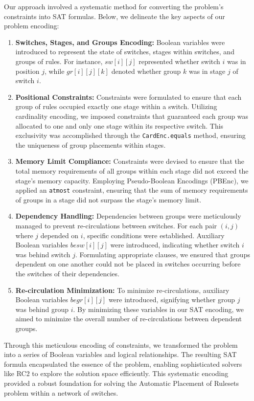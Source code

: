 Our approach involved a systematic method for converting the problem's constraints into SAT formulas. Below, we delineate the key aspects of our problem encoding:

\begin{enumerate}
    \item \textbf{Switches, Stages, and Groups Encoding:}
    Boolean variables were introduced to represent the state of switches, stages within switches, and groups of rules. For instance, \(sw[i][j]\) represented whether switch \(i\) was in position \(j\), while \(gr[i][j][k]\) denoted whether group \(k\) was in stage \(j\) of switch \(i\).

    \item \textbf{Positional Constraints:}
    Constraints were formulated to ensure that each group of rules occupied exactly one stage within a switch. Utilizing cardinality encoding, we imposed constraints that guaranteed each group was allocated to one and only one stage within its respective switch. This exclusivity was accomplished through the \texttt{CardEnc.equals} method, ensuring the uniqueness of group placements within stages.

    \item \textbf{Memory Limit Compliance:}
    Constraints were devised to ensure that the total memory requirements of all groups within each stage did not exceed the stage's memory capacity. Employing Pseudo-Boolean Encodings (PBEnc), we applied an \texttt{atmost} constraint, ensuring that the sum of memory requirements of groups in a stage did not surpass the stage's memory limit.

    \item \textbf{Dependency Handling:}
    Dependencies between groups were meticulously managed to prevent re-circulations between switches. For each pair \((i, j)\) where \(j\) depended on \(i\), specific conditions were established. Auxiliary Boolean variables \(besw[i][j]\) were introduced, indicating whether switch \(i\) was behind switch \(j\). Formulating appropriate clauses, we ensured that groups dependent on one another could not be placed in switches occurring before the switches of their dependencies.

    \item \textbf{Re-circulation Minimization:}
    To minimize re-circulations, auxiliary Boolean variables \(begr[i][j]\) were introduced, signifying whether group \(j\) was behind group \(i\). By minimizing these variables in our SAT encoding, we aimed to minimize the overall number of re-circulations between dependent groups.
\end{enumerate}

Through this meticulous encoding of constraints, we transformed the problem into a series of Boolean variables and logical relationships. The resulting SAT formula encapsulated the essence of the problem, enabling sophisticated solvers like RC2 to explore the solution space efficiently. This systematic encoding provided a robust foundation for solving the Automatic Placement of Rulesets problem within a network of switches.
